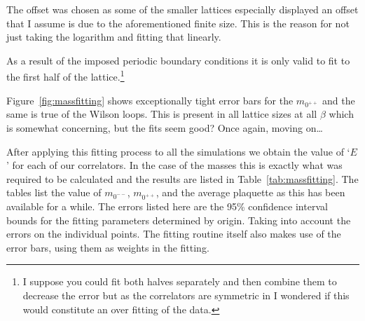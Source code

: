 \documentclass[12pt]{article}
\begin{document}
The offset was chosen as some of the smaller lattices especially displayed an offset that I assume is due to the aforementioned finite size. This is the reason for not just taking the logarithm and fitting that linearly.

\par As a result of the imposed periodic boundary conditions it is only valid to fit to the first half of the lattice.\footnote{I suppose you could fit both halves separately and then combine them to decrease the error but as the correlators are symmetric in I wondered if this would constitute an over fitting of the data.}

Figure~\ref{fig:massfitting} shows exceptionally tight error bars for the $m_{0^{++}}$ and the same is true of the Wilson loops. This is present in all lattice sizes at all $\beta$ which is somewhat concerning, but the fits seem good? Once again, moving on\ldots

\par After applying this fitting process to all the simulations we obtain the value of `$E$' for each of our correlators. In the case of the masses this is exactly what was required to be calculated and the results are listed in Table~\ref{tab:massfitting}. The tables list the value of $m_{0^{--}}$, $m_{0^{++}}$, and the average plaquette as this has been available for a while. The errors listed here are the 95\% confidence interval bounds for the fitting parameters determined by origin. Taking into account the errors on the individual points. The fitting routine itself also makes use of the error bars, using them as weights in the fitting.
\end{document}

